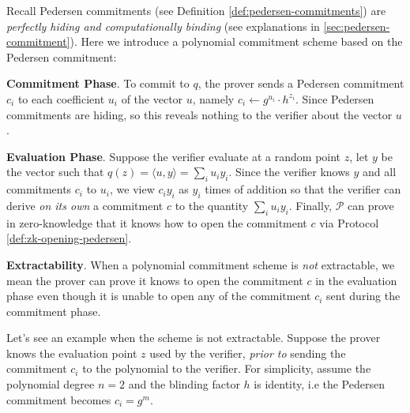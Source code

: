 \documentclass{article}
\begin{document}
Recall Pedersen commitments (see Definition \ref{def:pedersen-commitments}) are \textit{perfectly hiding and computationally binding} (see explanations in \ref{sec:pedersen-commitment}). Here we introduce a polynomial commitment scheme based on the Pedersen commitment: 

\textbf{Commitment Phase}. To commit to $q$, the prover sends a Pedersen commitment $c_i$ to each coefficient $u_i$ of the vector $u$, namely $c_i \leftarrow g^{u_i} \cdot h^{z_i}$. Since Pedersen commitments are hiding, so this reveals nothing to the verifier about the vector $u$. 

\textbf{Evaluation Phase}. Suppose the verifier evaluate at a random point $z$, let $y$ be the vector such that $q(z) = \langle u, y \rangle = \sum_i u_iy_i$. Since the verifier knows $y$ and all commitments $c_i$ to $u_i$, we view $c_i y_i$ as $y_i$ times of addition so that the verifier can derive \textit{on its own} a commitment $c$ to the quantity $\sum_i u_iy_i$. Finally, $\mathcal{P}$ can prove in zero-knowledge that it knows how to open the commitment $c$ via Protocol \ref{def:zk-opening-pedersen}. 

\textbf{Extractability}. When a polynomial commitment scheme is \textit{not} extractable, we mean the prover can prove it knows to open the commitment $c$ in the evaluation phase even though it is unable to open any of the commitment $c_i$ sent during the commitment phase. 

Let's see an example when the scheme is not extractable. Suppose the prover knows the evaluation point $z$ used by the verifier, \textit{prior to} sending the commitment $c_i$ to the polynomial to the verifier. For simplicity, assume the polynomial degree $n = 2$ and the blinding factor $h$ is identity, i.e the Pedersen commitment becomes $c_i = g^{m}$. 
\end{document}
